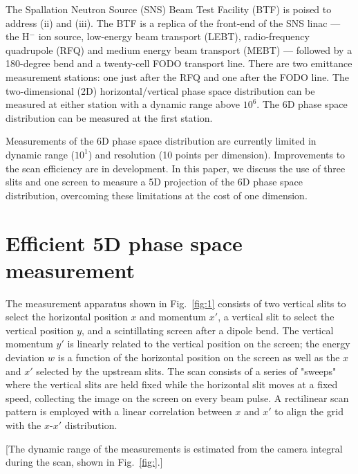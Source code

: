 \documentclass[letterpaper,
               keeplastbox,
               nospread,
               biblatex,
              ]{jacow}
\begin{document}
The Spallation Neutron Source (SNS) Beam Test Facility (BTF) is poised to address (ii) and (iii). The BTF is a replica of the front-end of the SNS linac — the H$^-$ ion source, low-energy beam transport (LEBT), radio-frequency quadrupole (RFQ) and medium energy beam transport (MEBT) — followed by a 180-degree bend and a twenty-cell FODO transport line. There are two emittance measurement stations: one just after the RFQ and one after the FODO line. The two-dimensional (2D) horizontal/vertical phase space distribution can be measured at either station with a dynamic range above $10^6$. The 6D phase space distribution can be measured at the first station.

Measurements of the 6D phase space distribution are currently limited in dynamic range ($10^1$) and resolution (10 points per dimension). Improvements to the scan efficiency are in development. In this paper, we discuss the use of three slits and one screen to measure a 5D projection of the 6D phase space distribution, overcoming these limitations at the cost of one dimension. 

\section{Efficient 5D phase space measurement}

The measurement apparatus shown in Fig.~\ref{fig:1} consists of two vertical slits to select the horizontal position $x$ and momentum $x'$, a vertical slit to select the vertical position $y$, and a scintillating screen after a dipole bend. The vertical momentum $y'$ is linearly related to the vertical position on the screen; the energy deviation $w$ is a function of the horizontal position on the screen as well as the $x$ and $x'$ selected by the upstream slits. The scan consists of a series of "sweeps" where the vertical slits are held fixed while the horizontal slit moves at a fixed speed, collecting the image on the screen on every beam pulse. A rectilinear scan pattern is employed with a linear correlation between $x$ and $x'$ to align the grid with the $x$-$x'$ distribution.

[The dynamic range of the measurements is estimated from the camera integral during the scan, shown in Fig.~\ref{fig:}.]
\end{document}
